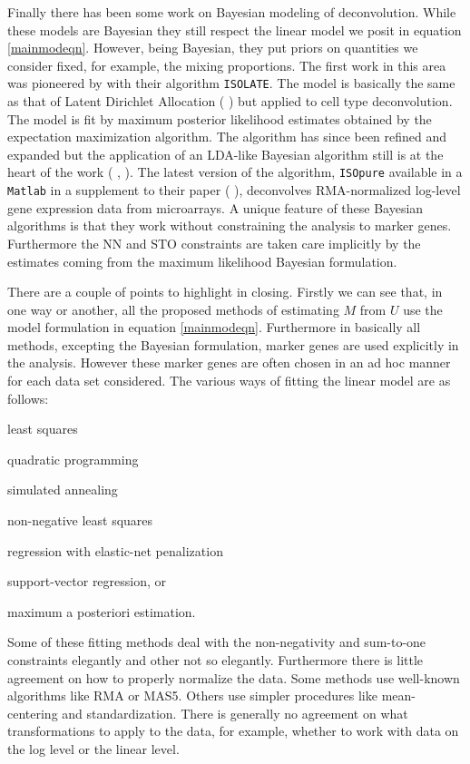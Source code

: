\documentclass[reqno,12pt,oneside]{report}\usepackage[]{graphicx}\usepackage[]{color}
\renewcommand{\citet}[1]{(\citeauthor{#1} \citeyear{#1})}
\theoremstyle{plain}
\theoremstyle{definition}
\theoremstyle{remark}
\numberwithin{theorem}{chapter}     %
\begin{document}
Finally there has been some work on Bayesian modeling of deconvolution. While these models are Bayesian they still respect the linear model we posit in equation \ref{mainmodeqn}. However, being Bayesian, they put priors on quantities we consider fixed, for example, the mixing proportions. The first work in this area was pioneered by \cite{Quon2009} with their algorithm \verb+ISOLATE+. The model is basically the same as that of Latent Dirichlet Allocation \citet{Blei2003} but applied to cell type deconvolution. The model is fit by  maximum posterior likelihood estimates obtained by the expectation maximization algorithm. The algorithm has since been refined and expanded but the application of an LDA-like Bayesian algorithm still is at the heart of the work (\citeauthor{Qiao2012} \citeyear{Qiao2012}, \citeauthor{Quon2013} \citeyear{Quon2013}). The latest version of the algorithm, \verb+ISOpure+ available in a \verb+Matlab+ in a supplement to their paper \citet{Quon2013}, deconvolves RMA-normalized log-level gene expression data from microarrays. A unique feature of these Bayesian algorithms is that they work without constraining the analysis to marker genes. Furthermore the NN and STO constraints are taken care implicitly by the estimates coming from the maximum likelihood Bayesian formulation.

There are a couple of points to highlight in closing. Firstly we can see that, in one way or another, all the proposed methods of estimating $M$ from $U$ use the model formulation in equation \ref{mainmodeqn}. Furthermore in basically all methods, excepting the Bayesian formulation, marker genes are used explicitly in the analysis. However these marker genes are often chosen in an ad hoc manner for each data set considered. The various ways of fitting the linear model are as follows:
\begin{enumerate*}[label=(\arabic*)]
\item least squares
\item quadratic programming
\item simulated annealing
\item non-negative least squares
\item regression with elastic-net penalization
\item support-vector regression, or 
\item maximum a posteriori estimation.
\end{enumerate*}
Some of these fitting methods deal with the non-negativity and sum-to-one constraints elegantly and other not so elegantly. Furthermore there is little agreement on how to properly normalize the data. Some methods use well-known algorithms like RMA or MAS5. Others use simpler procedures like mean-centering and standardization. There is generally no agreement on what transformations to apply to the data, for example, whether to work with data on the log level or the linear level.
\end{document}
